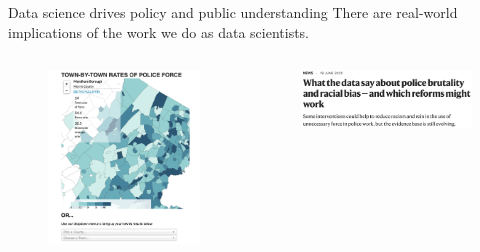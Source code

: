 \documentclass[aspectratio=169]{../latex_main/tntbeamer}  %
\begin{document}
    
    \begin{frame}{Data science drives policy and public understanding}
        There are real-world implications of the work we do as data scientists.
        \begin{columns}
            \begin{column}{.3\textwidth}
                    \begin{figure}
                        \centering
                        \includegraphics[scale=.6]{bild8}
                    \end{figure}
            \end{column}
            \begin{column}{.3\textwidth}
                    \begin{figure}
                        \centering
                        \includegraphics[scale=.4]{bild9}
                    \end{figure}
            \end{column}
            

\end{columns}
\end{frame}
\end{document}
